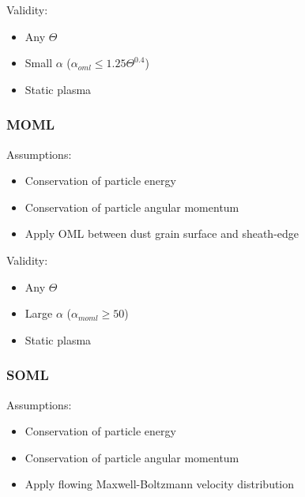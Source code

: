 \documentclass[journal]{Imperial_lab_report}
\begin{document}
\medskip

Validity:

\medskip

\begin{itemize}
\item Any $\Theta$
\item Small $\alpha$ ($\alpha_{oml} \leq 1.25\Theta^{0.4}$)
\item Static plasma
\end{itemize}

\medskip

\subsubsection{MOML}

\medskip

Assumptions:

\medskip

\begin{itemize}
\item Conservation of particle energy
\item Conservation of particle angular momentum
\item Apply OML between dust grain surface and sheath-edge
\end{itemize}

\medskip

Validity:

\medskip

\begin{itemize}
\item Any $\Theta$
\item Large $\alpha$ ($\alpha_{moml} \geq 50$)
\item Static plasma
\end{itemize}

\medskip

\subsubsection{SOML}

\medskip

Assumptions:

\medskip

\begin{itemize}
\item Conservation of particle energy
\item Conservation of particle angular momentum
\item Apply flowing Maxwell-Boltzmann velocity distribution 
\end{itemize}
\end{document}
